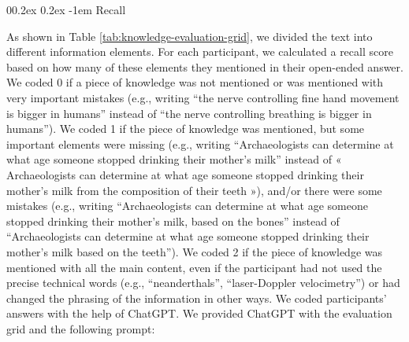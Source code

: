 \documentclass[
  doc,floatsintext]{apa6}
\makeatletter
\let\oldparagraph\paragraph
\renewcommand{\paragraph}{
    \@ifstar
      \xxxParagraphStar
      \xxxParagraphNoStar
  }
\newcommand{\xxxParagraphStar}[1]{\oldparagraph*{#1}\mbox{}}
\newcommand{\xxxParagraphNoStar}[1]{\oldparagraph{#1}\mbox{}}
\renewcommand{\paragraph}{\@startsection{paragraph}{4}{\parindent}%
  {0\baselineskip \@plus 0.2ex \@minus 0.2ex}%
  {-1em}%
  {\normalfont\normalsize\bfseries\itshape\typesectitle}}
\makeatother
\begin{document}
\paragraph{Recall}\label{recall}

As shown in Table \ref{tab:knowledge-evaluation-grid}, we divided the text into different information elements. For each participant, we calculated a recall score based on how many of these elements they mentioned in their open-ended answer. We coded 0 if a piece of knowledge was not mentioned or was mentioned with very important mistakes (e.g., writing ``the nerve controlling fine hand movement is bigger in humans'' instead of ``the nerve controlling breathing is bigger in humans''). We coded 1 if the piece of knowledge was mentioned, but some important elements were missing (e.g., writing ``Archaeologists can determine at what age someone stopped drinking their mother's milk'' instead of « Archaeologists can determine at what age someone stopped drinking their mother's milk from the composition of their teeth »), and/or there were some mistakes (e.g., writing ``Archaeologists can determine at what age someone stopped drinking their mother's milk, based on the bones'' instead of ``Archaeologists can determine at what age someone stopped drinking their mother's milk based on the teeth''). We coded 2 if the piece of knowledge was mentioned with all the main content, even if the participant had not used the precise technical words (e.g., ``neanderthals'', ``laser-Doppler velocimetry'') or had changed the phrasing of the information in other ways. We coded participants' answers with the help of ChatGPT. We provided ChatGPT with the evaluation grid and the following prompt:
\end{document}
